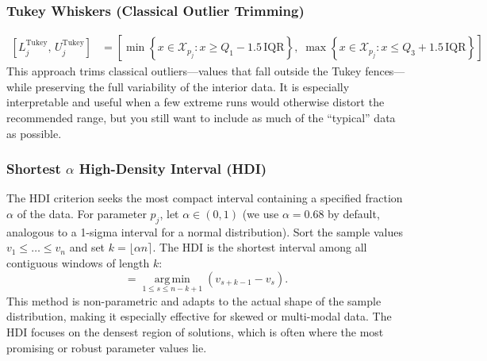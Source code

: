 \documentclass[12pt,a4paper]{article}
\begin{document}
\subsubsection{Tukey Whiskers (Classical Outlier Trimming)}
\begin{align}
    \left[ L^{\text{Tukey}}_j,\, U^{\text{Tukey}}_j \right] &= \left[
        \min\left\{ x \in \mathcal{X}_{p_j} : x \ge Q_1 - 1.5\,\mathrm{IQR} \right\},\;
        \max\left\{ x \in \mathcal{X}_{p_j} : x \le Q_3 + 1.5\,\mathrm{IQR} \right\}
    \right]
\end{align}
This approach trims classical outliers—values that fall outside the Tukey fences—while preserving the full variability of the interior data. It is especially interpretable and useful when a few extreme runs would otherwise distort the recommended range, but you still want to include as much of the “typical” data as possible.

\subsubsection{Shortest $\alpha$ High-Density Interval (HDI)}
The HDI criterion seeks the most compact interval containing a specified fraction $\alpha$ of the data. For parameter $p_j$, let $\alpha\in(0,1)$ (we use $\alpha=0.68$ by default, analogous to a 1-sigma interval for a normal distribution). Sort the sample values $v_1\le\dots\le v_n$ and set $k=\big\lfloor \alpha n\big\rceil$. The HDI is the shortest interval among all contiguous windows of length $k$:
\begin{equation}
    [L^{\text{HDI}}_j, U^{\text{HDI}}_j] = \operatorname*{arg\,min}_{1\le s\le n-k+1} (v_{s+k-1}-v_s).
\end{equation}
This method is non-parametric and adapts to the actual shape of the sample distribution, making it especially effective for skewed or multi-modal data. The HDI focuses on the densest region of solutions, which is often where the most promising or robust parameter values lie.
\end{document}
